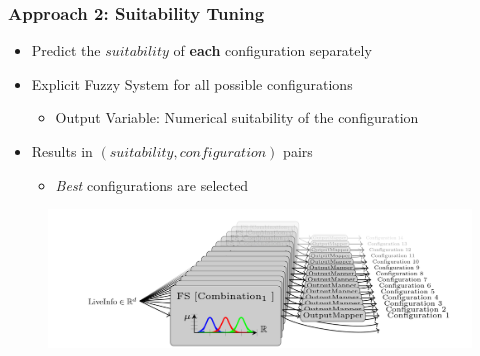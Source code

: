 \documentclass[
	10pt,
	t		%
]{beamer}
\begin{document}
\begin{frame}
	\frametitle{Approach 2: Suitability Tuning}
	\begin{itemize}
		\item Predict the $suitability$ of \textbf{each} configuration separately
		\item Explicit Fuzzy System for all possible configurations
		      \begin{itemize}
			      \item Output Variable: Numerical suitability of the configuration
		      \end{itemize}
		\item Results in $(suitability, configuration)$ pairs
		      \begin{itemize}
			      \item \textit{Best} configurations are selected
		      \end{itemize}
	\end{itemize}
	
	\begin{figure}
		\centering
		\includegraphics[width=1\textwidth]{figures/suitability-approach.png}
	\end{figure}
\end{frame}
\end{document}
